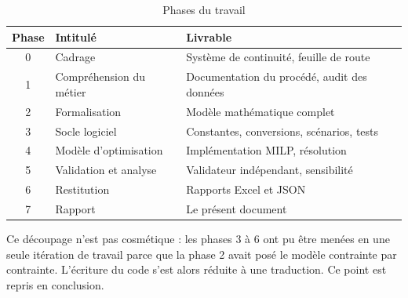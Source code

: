 \begin{table}[H]
\centering
\caption{Phases du travail}
\label{tab:phases}
\begin{tabular}{@{}clp{7.5cm}@{}}
\toprule
\textbf{Phase} & \textbf{Intitulé} & \textbf{Livrable} \\
\midrule
0 & Cadrage & Système de continuité, feuille de route \\
1 & Compréhension du métier & Documentation du procédé, audit des données \\
2 & Formalisation & Modèle mathématique complet \\
3 & Socle logiciel & Constantes, conversions, scénarios, tests \\
4 & Modèle d'optimisation & Implémentation MILP, résolution \\
5 & Validation et analyse & Validateur indépendant, sensibilité \\
6 & Restitution & Rapports Excel et JSON \\
7 & Rapport & Le présent document \\
\bottomrule
\end{tabular}
\end{table}

Ce découpage n'est pas cosmétique : les phases 3 à 6 ont pu être menées en une seule
itération de travail parce que la phase 2 avait posé le modèle contrainte par contrainte.
L'écriture du code s'est alors réduite à une traduction. Ce point est repris en conclusion.
